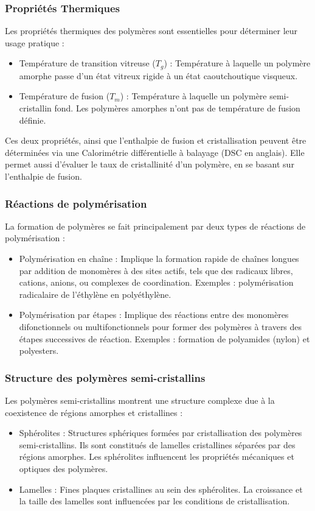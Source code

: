 \documentclass{article}
\begin{document}
        \subsubsection{Propriétés Thermiques}
        Les propriétés thermiques des polymères sont essentielles pour déterminer leur usage pratique :
        \begin{itemize}
            \item Température de transition vitreuse ($T_g$) : Température à laquelle un polymère amorphe passe d'un état vitreux rigide à un état caoutchoutique visqueux.
            \item Température de fusion ($T_m$) : Température à laquelle un polymère semi-cristallin fond. Les polymères amorphes n'ont pas de température de fusion définie.
        \end{itemize}
        Ces deux propriétés, ainsi que l'enthalpie de fusion et cristallisation peuvent être déterminées via une Calorimétrie différentielle à balayage (DSC en anglais). Elle permet aussi d'évaluer le taux de cristallinité d'un polymère, en se basant sur l'enthalpie de fusion.
    
        \subsubsection{Réactions de polymérisation}
        La formation de polymères se fait principalement par deux types de réactions de polymérisation :
        \begin{itemize}
            \item Polymérisation en chaîne : Implique la formation rapide de chaînes longues par addition de monomères à des sites actifs, tels que des radicaux libres, cations, anions, ou complexes de coordination. Exemples : polymérisation radicalaire de l'éthylène en polyéthylène.
            \item Polymérisation par étapes : Implique des réactions entre des monomères difonctionnels ou multifonctionnels pour former des polymères à travers des étapes successives de réaction. Exemples : formation de polyamides (nylon) et polyesters.
        \end{itemize}
    
        \subsubsection{Structure des polymères semi-cristallins}
        Les polymères semi-cristallins montrent une structure complexe due à la coexistence de régions amorphes et cristallines :
        \begin{itemize}
            \item Sphérolites : Structures sphériques formées par cristallisation des polymères semi-cristallins. Ils sont constitués de lamelles cristallines séparées par des régions amorphes. Les sphérolites influencent les propriétés mécaniques et optiques des polymères.
            \item Lamelles : Fines plaques cristallines au sein des sphérolites. La croissance et la taille des lamelles sont influencées par les conditions de cristallisation.
        \end{itemize}
\pagebreak
\end{document}
